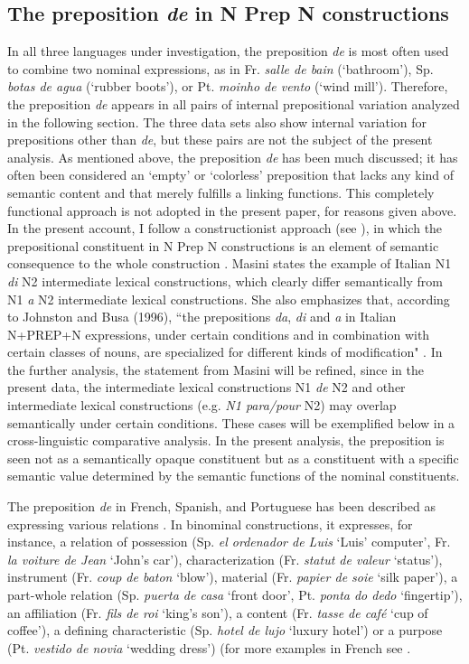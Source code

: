 \documentclass[output=paper]{langsci/langscibook}
\begin{document}
\subsection{The preposition \textit{de} in N Prep N constructions}
In all three languages under investigation, the preposition \textit{de} is most often used to combine two nominal expressions, as in Fr. \textit{salle de bain}  (`bathroom'), Sp. \textit{botas de agua} (`rubber boots'), or Pt. \textit{moinho de vento} (`wind mill'). Therefore, the preposition \textit{de} appears in all pairs of internal prepositional variation analyzed in the following section. The three data sets also show internal variation for prepositions other than \textit{de}, but these pairs are not the subject of the present analysis. As mentioned above, the preposition \textit{de} has been much discussed; it has often been considered an `empty' or `colorless' preposition that lacks any kind of semantic content and that merely fulfills a linking functions. This completely functional approach is not adopted in the present paper, for reasons given above.
In the present account, I follow a constructionist approach (see \citealt{Masini:2009}), in which the prepositional constituent in N Prep N constructions is an element of semantic consequence to the whole construction \citep[262]{Masini:2009}. Masini states the example of Italian N1 \textit{di} N2 intermediate lexical constructions, which clearly differ semantically from N1 \textit{a} N2 intermediate lexical constructions. She also emphasizes that, according to Johnston and Busa (1996), ``the prepositions \textit{da}, \textit{di} and \textit{a} in Italian N+PREP+N expressions, under certain conditions and in combination with certain classes of nouns, are specialized for different kinds of modification" \citep[262]{Masini:2009}. In the further analysis, the statement from Masini will be refined, since in the present data, the intermediate lexical constructions N1 \textit{de} N2 and other intermediate lexical constructions (e.g. \textit{N1 para/pour} N2) may overlap semantically under certain conditions. These cases will be exemplified below in a cross-linguistic comparative analysis. In the present analysis, the preposition is seen not as a semantically opaque constituent but as a constituent with a specific semantic value determined by the semantic functions of the nominal constituents.

The preposition \textit{de} in French, Spanish, and Portuguese has been described as expressing various relations \citep[187]{Bartning:1993}. In binominal constructions, it expresses, for instance, a relation of possession (Sp. \textit{el ordenador de Luis} `Luis' computer', Fr. \textit{la voiture de Jean} `John’s car'), characterization (Fr. \textit{statut de valeur} `status'), instrument (Fr. \textit{coup de baton} `blow'), material (Fr. \textit{papier de soie} `silk paper'), a part-whole relation (Sp. \textit{puerta de casa} `front door', Pt. \textit{ponta do dedo} `fingertip'), an affiliation (Fr. \textit{fils de roi} ‘king’s son’), a content (Fr. \textit{tasse de café} `cup of coffee'), a defining characteristic (Sp. \textit{hotel de lujo} `luxury hotel') or a purpose (Pt. \textit{vestido de novia} `wedding dress') (for more examples in French see \citep[291 ff.]{Lang:1991}.
\end{document}
